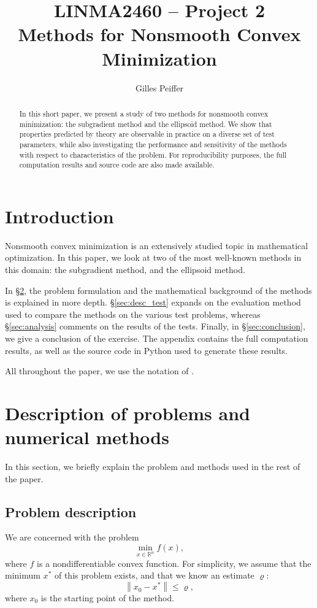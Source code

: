 \documentclass[final]{aomart}
\title[Methods for Nonsmooth Convex Minimization]{LINMA2460 -- Project 2\\
Methods for Nonsmooth Convex Minimization}
\author{Gilles Peiffer}
\newcommand{\Rn}{\mathbb{R}^n}
\newcommand{\xopt}{x^*}
\newtheorem[{}\it]{thm}{Theorem}[section]
\theoremstyle{definition}
\newtheorem*[{}\it]{notation}{Notation}
\numberwithin{equation}{section}
\newcommand{\secref}[1]{\S\ref{#1}}
\renewcommand{\rho}{\varrho}
\newcommand{\enVert}[1]{\left\lVert#1\right\rVert}
\let\norm=\enVert
\begin{document}
\begin{abstract}
	In this short paper, we present a study of two methods for nonsmooth convex minimization: the subgradient method and the ellipsoid method.
	We show that properties predicted by theory are observable in practice on a diverse set of test parameters, while also investigating the performance and sensitivity of the methods with respect to characteristics of the problem.
	For reproducibility purposes, the full computation results and source code are also made available.
\end{abstract}

\maketitle
\tableofcontents
\newpage

\section{Introduction}
Nonsmooth convex minimization is an extensively studied topic in mathematical optimization.
In this paper, we look at two of the most well-known methods in this domain: the subgradient method, and the ellipsoid method.

In \secref{sec:desc_pnm}, the problem formulation and the mathematical background of the methods is explained in more depth.
\secref{sec:desc_test} expands on the evaluation method used to compare the methods on the various test problems, whereas \secref{sec:analysis} comments on the results of the tests.
Finally, in \secref{sec:conclusion}, we give a conclusion of the exercise.
The appendix contains the full computation results, as well as the source code in Python used to generate these results.

All throughout the paper, we use the notation of \cite{Nesterov2018}.

\section{Description of problems and numerical methods}
\label{sec:desc_pnm}
In this section, we briefly explain the problem and methods used in the rest of the paper.

\subsection{Problem description}
\label{sec:prob}
We are concerned with the problem
\begin{equation}
\min_{x \in \Rn} f(x),
\end{equation}
where \(f\) is a nondifferentiable convex function.
For simplicity, we assume that the minimum \(\xopt\) of this problem exists, and that we know an estimate \(\rho\):
\begin{equation}
\norm{x_0 - \xopt} \leqslant \rho,
\end{equation}
where \(x_0\) is the starting point of the method.
\end{document}

